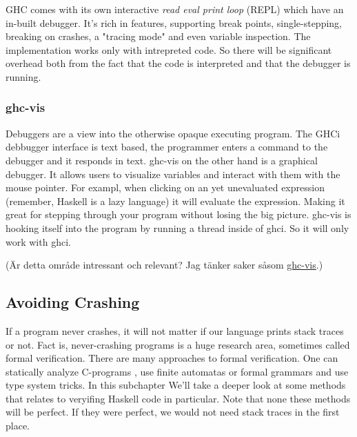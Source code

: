 GHC comes with its own interactive \emph{read eval print loop} (REPL)
which have an in-built debugger. It's rich in features, supporting break
points, single-stepping, breaking on crashes, a "tracing mode" and even
variable inspection. The implementation works only with intrepreted
code. \cite{ghci_debugger} So there will be significant overhead both
from the fact that the code is interpreted and that the debugger is
running.


\subsubsection{ghc-vis}

Debuggers are a view into the otherwise opaque executing program. The
GHCi debbugger interface is text based, the programmer enters a command
to the debugger and it responds in text.  ghc-vis on the other hand is a
graphical debugger.  It allows users to visualize variables and interact
with them with the mouse pointer. For exampl, when clicking on an yet
unevaluated expression (remember, Haskell is a lazy language) it will
evaluate the expression.  Making it great for stepping through your
program without losing the big picture.  ghc-vis is hooking itself into
the program by running a thread inside of ghci. So it will only work
with ghci.  \cite{thesisFelsingBA}

(Är detta område intressant och relevant? Jag tänker saker såsom
\href{http://felsin9.de/nnis/ghc-vis/}{ghc-vis}.)


\subsection{Avoiding Crashing}

If a program never crashes,
it will not matter if our language prints stack traces or not. Fact is,
never-crashing programs is a huge research area, sometimes called formal
verification. There are many approaches to formal verification. One
can statically analyze C-programs \cite{ckl2004},   %
use finite automatas %
or formal grammars \cite{dantam2013motion} %
and use type system tricks. %
In this subchapter We'll take a deeper look at some methods that
relates to veryifing Haskell code in particular. Note that none
these methods will be perfect. If they were perfect, we would not need
stack traces in the first place.

